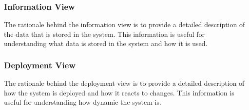 \documentclass[a4paper]{article}
\begin{document}
    \subsubsection{Information View}
    The rationale behind the information view is to provide a detailed description of the data that is stored in the system.
    This information is useful for understanding what data is stored in the system and how it is used.
    \subsubsection{Deployment View}
    The rationale behind the deployment view is to provide a detailed description of how the system is deployed and how it reacts
    to changes. This information is useful for understanding how dynamic the system is.
    
\end{document}
